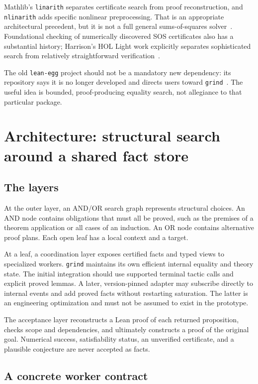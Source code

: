 \documentclass[11pt,a4paper]{article}
\theoremstyle{definition}
\newcommand{\grind}{\texttt{grind}}
\newcommand{\code}[1]{\texttt{#1}}
\begin{document}
Mathlib's \code{linarith} separates certificate search from proof reconstruction, and \code{nlinarith} adds specific nonlinear preprocessing. That is an appropriate architectural precedent, but it is not a full general sums-of-squares solver~\cite{linarith}. Foundational checking of numerically discovered SOS certificates also has a substantial history; Harrison's HOL Light work explicitly separates sophisticated search from relatively straightforward verification~\cite{harrison}.

The old \code{lean-egg} project should not be a mandatory new dependency: its repository says it is no longer developed and directs users toward \grind{}~\cite{egg}. The useful idea is bounded, proof-producing equality search, not allegiance to that particular package.

\section{Architecture: structural search around a shared fact store}

\subsection{The layers}

At the outer layer, an AND/OR search graph represents structural choices. An AND node contains obligations that must all be proved, such as the premises of a theorem application or all cases of an induction. An OR node contains alternative proof plans. Each open leaf has a local context and a target.

At a leaf, a coordination layer exposes certified facts and typed views to specialized workers. \grind{} maintains its own efficient internal equality and theory state. The initial integration should use supported terminal tactic calls and explicit proved lemmas. A later, version-pinned adapter may subscribe directly to internal events and add proved facts without restarting saturation. The latter is an engineering optimization and must not be assumed to exist in the prototype.

The acceptance layer reconstructs a Lean proof of each returned proposition, checks scope and dependencies, and ultimately constructs a proof of the original goal. Numerical success, satisfiability status, an unverified certificate, and a plausible conjecture are never accepted as facts.

\subsection{A concrete worker contract}
\end{document}
